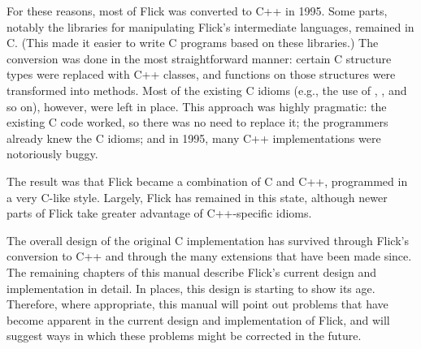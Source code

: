For these reasons, most of Flick was converted to C++ in 1995.  Some parts,
notably the libraries for manipulating Flick's intermediate languages, remained
in C\@.  (This made it easier to write C programs based on these libraries.)
The conversion was done in the most straightforward manner: certain C structure
types were replaced with C++ classes, and functions on those structures were
transformed into methods.  Most of the existing C idioms (e.g., the use of
, , and so on), however, were left in
place.  This approach was highly pragmatic: the existing C code worked, so
there was no need to replace it; the programmers already knew the C idioms; and
in 1995, many C++ implementations were notoriously buggy.

The result was that Flick became a combination of C and C++, programmed in a
very C-like style.  Largely, Flick has remained in this state, although newer
parts of Flick take greater advantage of C++-specific idioms.

The overall design of the original C implementation has survived through
Flick's conversion to C++ and through the many extensions that have been made
since.  The remaining chapters of this manual describe Flick's current design
and implementation in detail.  In places, this design is starting to show its
age.  Therefore, where appropriate, this manual will point out problems that
have become apparent in the current design and implementation of Flick, and
will suggest ways in which these problems might be corrected in the future.



